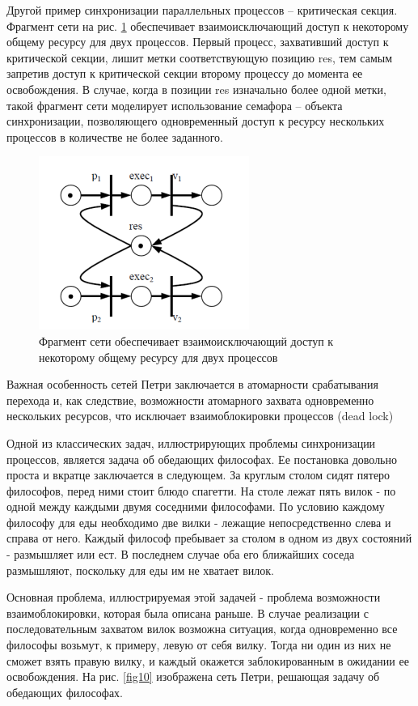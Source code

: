 Другой пример синхронизации параллельных процессов – критическая секция. Фрагмент сети на рис. \ref{fig9} обеспечивает взаимоисключающий доступ к некоторому общему ресурсу для двух процессов. Первый процесс, захвативший доступ к критической секции, лишит метки соответствующую позицию res, тем самым запретив доступ к критической секции второму процессу до момента ее освобождения. В случае, когда в позиции res изначально более одной метки, такой фрагмент сети моделирует использование семафора – объекта синхронизации, позволяющего одновременный доступ к ресурсу нескольких процессов в количестве не более заданного.

\begin{figure}[ht]
\centerline{\includegraphics[width=0.5\linewidth]{images/image9.png}}
\caption{Фрагмент сети обеспечивает взаимоисключающий доступ к некоторому общему ресурсу для двух процессов}
\label{fig9}
\end{figure}

Важная особенность сетей Петри заключается в атомарности срабатывания перехода и, как следствие, возможности атомарного захвата одновременно нескольких ресурсов, что исключает взаимоблокировки процессов (dead lock)

Одной из классических задач, иллюстрирующих проблемы синхронизации процессов, является задача об обедающих философах. Ее постановка довольно проста и вкратце заключается в следующем. За круглым столом сидят пятеро философов, перед ними стоит блюдо спагетти. На столе лежат пять вилок - по одной между каждыми двумя соседними философами. По условию каждому философу для еды необходимо две вилки - лежащие непосредственно слева и справа от него. Каждый философ пребывает за столом в одном из двух состояний - размышляет или ест. В последнем случае оба его ближайших соседа размышляют, поскольку для еды им не хватает вилок.

Основная проблема, иллюстрируемая этой задачей - проблема возможности взаимоблокировки, которая была описана раньше. В случае реализации с последовательным захватом вилок возможна ситуация, когда одновременно все философы возьмут, к примеру, левую от себя вилку. Тогда ни один из них не сможет взять правую вилку, и каждый окажется заблокированным в ожидании ее освобождения. На рис. \ref{fig10} изображена сеть Петри, решающая задачу об обедающих философах.

